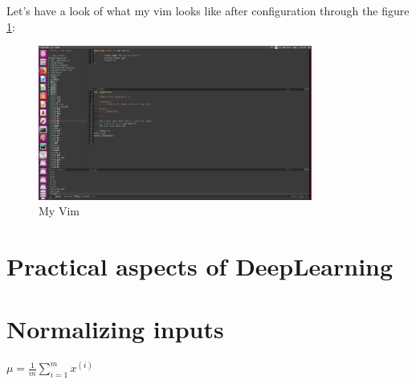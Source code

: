 \documentclass{article}
\begin{document}
Let's have a look of what my vim looks like after configuration through the figure \ref{my vim}:
\begin{figure}[htbp]
\centering
\includegraphics[width=9cm]{2018-06-09 09-28-03屏幕截图.png}
\caption{My Vim}
\label{my vim}
\end{figure}


\section*{Practical aspects of DeepLearning}
\section{Normalizing inputs}
 


$\mu = \frac{1}{m}\sum\limits_{i =1}^{m}x^{(i)}$
\end{document}
